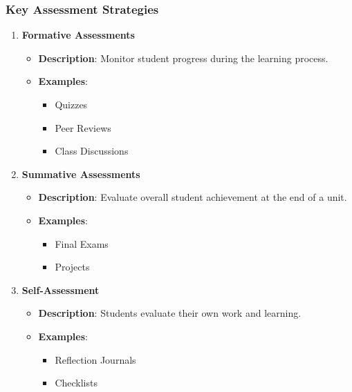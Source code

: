 \documentclass[aspectratio=169]{beamer}
\begin{document}
\begin{frame}[fragile]
    \frametitle{Key Assessment Strategies}
    \begin{enumerate}
        \item \textbf{Formative Assessments}
            \begin{itemize}
                \item \textbf{Description}: Monitor student progress during the learning process.
                \item \textbf{Examples}:
                    \begin{itemize}
                        \item Quizzes
                        \item Peer Reviews
                        \item Class Discussions
                    \end{itemize}
            \end{itemize}
        
        \item \textbf{Summative Assessments}
            \begin{itemize}
                \item \textbf{Description}: Evaluate overall student achievement at the end of a unit.
                \item \textbf{Examples}:
                    \begin{itemize}
                        \item Final Exams
                        \item Projects
                    \end{itemize}
            \end{itemize}

        \item \textbf{Self-Assessment}
            \begin{itemize}
                \item \textbf{Description}: Students evaluate their own work and learning.
                \item \textbf{Examples}:
                    \begin{itemize}
                        \item Reflection Journals
                        \item Checklists
                    \end{itemize}
            \end{itemize}
    \end{enumerate}
\end{frame}
\end{document}
